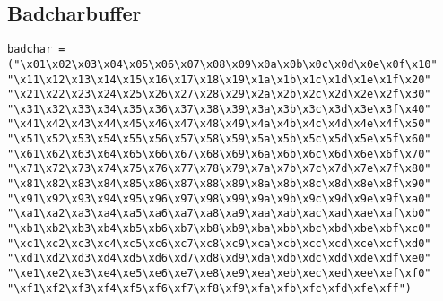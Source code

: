 \documentclass[a4paper,12pt, twoside,]{report}
\begin{document}
\subsection{Badcharbuffer}
\begin{lstlisting}[caption={Bad char buffer},label=bad]
badchar = ("\x01\x02\x03\x04\x05\x06\x07\x08\x09\x0a\x0b\x0c\x0d\x0e\x0f\x10"
"\x11\x12\x13\x14\x15\x16\x17\x18\x19\x1a\x1b\x1c\x1d\x1e\x1f\x20"
"\x21\x22\x23\x24\x25\x26\x27\x28\x29\x2a\x2b\x2c\x2d\x2e\x2f\x30"
"\x31\x32\x33\x34\x35\x36\x37\x38\x39\x3a\x3b\x3c\x3d\x3e\x3f\x40"
"\x41\x42\x43\x44\x45\x46\x47\x48\x49\x4a\x4b\x4c\x4d\x4e\x4f\x50"
"\x51\x52\x53\x54\x55\x56\x57\x58\x59\x5a\x5b\x5c\x5d\x5e\x5f\x60"
"\x61\x62\x63\x64\x65\x66\x67\x68\x69\x6a\x6b\x6c\x6d\x6e\x6f\x70"
"\x71\x72\x73\x74\x75\x76\x77\x78\x79\x7a\x7b\x7c\x7d\x7e\x7f\x80"
"\x81\x82\x83\x84\x85\x86\x87\x88\x89\x8a\x8b\x8c\x8d\x8e\x8f\x90"
"\x91\x92\x93\x94\x95\x96\x97\x98\x99\x9a\x9b\x9c\x9d\x9e\x9f\xa0"
"\xa1\xa2\xa3\xa4\xa5\xa6\xa7\xa8\xa9\xaa\xab\xac\xad\xae\xaf\xb0"
"\xb1\xb2\xb3\xb4\xb5\xb6\xb7\xb8\xb9\xba\xbb\xbc\xbd\xbe\xbf\xc0"
"\xc1\xc2\xc3\xc4\xc5\xc6\xc7\xc8\xc9\xca\xcb\xcc\xcd\xce\xcf\xd0"
"\xd1\xd2\xd3\xd4\xd5\xd6\xd7\xd8\xd9\xda\xdb\xdc\xdd\xde\xdf\xe0"
"\xe1\xe2\xe3\xe4\xe5\xe6\xe7\xe8\xe9\xea\xeb\xec\xed\xee\xef\xf0"
"\xf1\xf2\xf3\xf4\xf5\xf6\xf7\xf8\xf9\xfa\xfb\xfc\xfd\xfe\xff")
\end{lstlisting}
\end{document}
